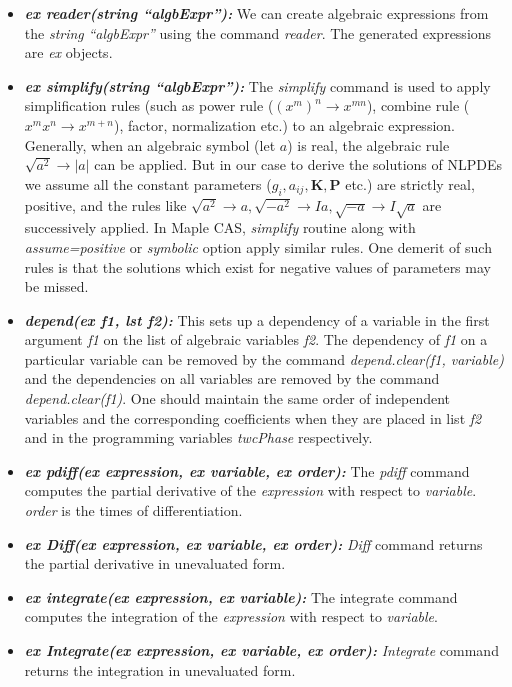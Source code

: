 \documentclass[prd,aps,floats,showkeys,nofootinbib,notitlepage]{revtex4-2}
\begin{document}
\begin{itemize}
		\item[] {\em \textbf{ex reader(string ``algbExpr''):}} We can create algebraic expressions from the {\em string} {\em ``algbExpr''} using the command {\em reader}. The generated expressions are {\em ex } objects.
		\item[] {\em \textbf{ex simplify(string ``algbExpr''):}} The {\em simplify} command is used to apply simplification rules (such as power rule ($(x^m)^n\rightarrow x^{mn}$), combine rule ($x^mx^n\rightarrow x^{m+n}$), factor, normalization etc.) to an algebraic expression. Generally, when an algebraic symbol (let $a$) is real, the algebraic rule $\sqrt{a^2}\rightarrow |a|$ can be applied. But in our case to derive the solutions of NLPDEs we assume all the constant parameters ($g_i,a_{ij},\boldsymbol{K},\boldsymbol{P}$ etc.) are strictly real, positive, and the rules like $\sqrt{a^2}\rightarrow a,\sqrt{-a^2}\rightarrow Ia, \sqrt{-a}\rightarrow I\sqrt{a}$ are successively applied. In {Maple} CAS, {\em simplify} routine along with {\em assume=positive} or {\em symbolic} option apply similar rules. One demerit of such rules is that the solutions which exist for negative values of parameters may be missed. 
		
		\item[] {\em \textbf{depend(ex f1, lst f2):}} This sets up a dependency of a variable in the first argument {\em f1} on the list of algebraic variables {\em f2}. The dependency of {\em f1} on a particular variable can be removed by the command {\em depend.clear(f1, variable)} and the dependencies on all variables are removed by the command {\em depend.clear(f1)}.
		One should maintain the same order of independent variables and the corresponding coefficients when they are placed in list {\em f2} and in the programming variables {\em twcPhase} respectively. 
		\item[] {\em \textbf{ex pdiff(ex expression, ex variable, ex order):}} The {\em pdiff} command computes the partial derivative of the {\em expression} with respect to {\em variable}. {\em order} is the times of differentiation.
		\item[] {\em \textbf{ex Diff(ex expression, ex variable, ex order):}} {\em Diff} command returns the partial derivative in unevaluated form.
		\item[] {\em \textbf{ex integrate(ex expression, ex variable):}} The integrate command computes the integration of the {\em expression} with respect to {\em variable}. 
		
		\item[] {\em \textbf{ex Integrate(ex expression, ex variable, ex order):}} {\em Integrate} command returns the integration in unevaluated form.
		

\end{itemize}
\end{document}
